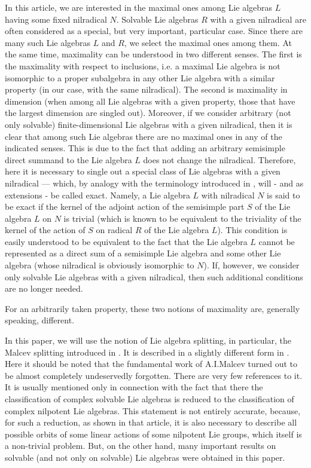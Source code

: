 \documentclass{amsart}
\begin{document}
In this article, we are interested in the maximal ones among Lie algebras $L$ having some fixed nilradical $N$. Solvable Lie algebras $R$ with a given nilradical are often considered as a special, but very important, particular case. Since there are many such Lie algebras $L$ and $R$, we select the maximal ones among them. At the same time, maximality can be understood in two different senses. The first is the maximality with respect to inclusions, i.e. a maximal Lie algebra is not isomorphic to a proper subalgebra in any other Lie algebra with a similar property (in our case, with the same nilradical). The second is maximality in dimension (when among all Lie algebras with a given property, those that have the largest dimension are singled out). Moreover, if we consider arbitrary (not only solvable) finite-dimensional Lie algebras with a given nilradical, then it is clear that among such Lie algebras there are no maximal ones in any of the indicated senses. This is due to the fact that adding an arbitrary semisimple direct summand to the Lie algebra $L$ does not change the nilradical. Therefore, here it is necessary to single out a special class of Lie algebras with a given nilradical --- which, by analogy with the terminology introduced in \cite {HO}, will - and as extensions - be called exact. Namely, a Lie algebra $L$ with nilradical $N$ is said to be exact if the kernel of the adjoint action of the semisimple part $S$ of the Lie algebra $L$ on $N$ is trivial (which is known to be equivalent to the triviality of the kernel of the action of $S$ on radical $R$ of the Lie algebra $L$). This condition is easily understood to be equivalent to the fact that the Lie algebra $L$ cannot be represented as a direct sum of a semisimple Lie algebra and some other Lie algebra (whose nilradical is obviously isomorphic to $N$). If, however, we consider only solvable Lie algebras with a given nilradical, then such additional conditions are no longer needed.

For an arbitrarily taken property, these two notions of maximality are, generally speaking, different. 


In this paper, we will use the notion of Lie algebra splitting, in particular, the Malcev splitting introduced in \cite {Ma}. It is described in a slightly different form in \cite {G1}. Here it should be noted that the fundamental work of A.I.Malcev \cite {Ma} turned out to be almost completely undeservedly forgotten. There are very few references to it. It is usually mentioned only in connection with the fact that there the classification of complex solvable Lie algebras is reduced to the classification of complex nilpotent Lie algebras. This statement is not entirely accurate, because, for such a reduction, as shown in that article, it is also necessary to describe all possible orbits of some linear actions of some nilpotent Lie groups, which itself is a non-trivial problem. But, on the other hand, many important results on solvable (and not only on solvable) Lie algebras were obtained in this paper.
\end{document}
